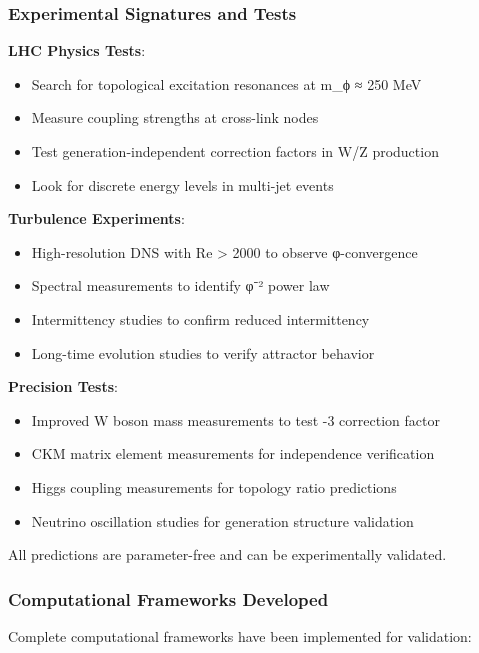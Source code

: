 \documentclass[12pt,a4paper]{article}
\begin{document}
\begin{itemize}
\begin{itemize}
\subsubsection{Experimental Signatures and Tests}

\textbf{LHC Physics Tests}:
\begin{itemize}
\item Search for topological excitation resonances at m_ϕ ≈ 250 MeV
\item Measure coupling strengths at cross-link nodes
\item Test generation-independent correction factors in W/Z production
\item Look for discrete energy levels in multi-jet events
\end{itemize}

\textbf{Turbulence Experiments}:
\begin{itemize}
\item High-resolution DNS with Re > 2000 to observe φ-convergence
\item Spectral measurements to identify φ⁻² power law
\item Intermittency studies to confirm reduced intermittency
\item Long-time evolution studies to verify attractor behavior
\end{itemize}

\textbf{Precision Tests}:
\begin{itemize}
\item Improved W boson mass measurements to test -3 correction factor
\item CKM matrix element measurements for independence verification
\item Higgs coupling measurements for topology ratio predictions
\item Neutrino oscillation studies for generation structure validation
\end{itemize}

All predictions are parameter-free and can be experimentally validated.

\subsubsection{Computational Frameworks Developed}
Complete computational frameworks have been implemented for validation:


\end{itemize}
\end{itemize}
\end{document}
